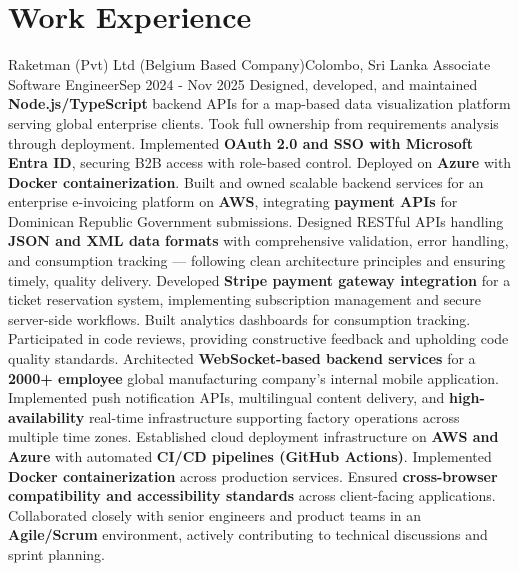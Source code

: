 \section{Work Experience}
  \resumeSubHeadingListStart

    \resumeSubheading
      {Raketman (Pvt) Ltd (Belgium Based Company)}{Colombo, Sri Lanka}
      {Associate Software Engineer}{Sep 2024 - Nov 2025}
      \resumeItemListStart
          {Designed, developed, and maintained \textbf{Node.js/TypeScript} backend APIs for a map-based data visualization platform serving global enterprise clients. Took full ownership from requirements analysis through deployment. Implemented \textbf{OAuth 2.0 and SSO with Microsoft Entra ID}, securing B2B access with role-based control. Deployed on \textbf{Azure} with \textbf{Docker containerization}.}
          {Built and owned scalable backend services for an enterprise e-invoicing platform on \textbf{AWS}, integrating \textbf{payment APIs} for Dominican Republic Government submissions. Designed RESTful APIs handling \textbf{JSON and XML data formats} with comprehensive validation, error handling, and consumption tracking — following clean architecture principles and ensuring timely, quality delivery.}
          {Developed \textbf{Stripe payment gateway integration} for a ticket reservation system, implementing subscription management and secure server-side workflows. Built analytics dashboards for consumption tracking. Participated in code reviews, providing constructive feedback and upholding code quality standards.}
          {Architected \textbf{WebSocket-based backend services} for a \textbf{2000+ employee} global manufacturing company's internal mobile application. Implemented push notification APIs, multilingual content delivery, and \textbf{high-availability} real-time infrastructure supporting factory operations across multiple time zones.}
          {Established cloud deployment infrastructure on \textbf{AWS and Azure} with automated \textbf{CI/CD pipelines (GitHub Actions)}. Implemented \textbf{Docker containerization} across production services. Ensured \textbf{cross-browser compatibility and accessibility standards} across client-facing applications. Collaborated closely with senior engineers and product teams in an \textbf{Agile/Scrum} environment, actively contributing to technical discussions and sprint planning.}
      \resumeItemListEnd

